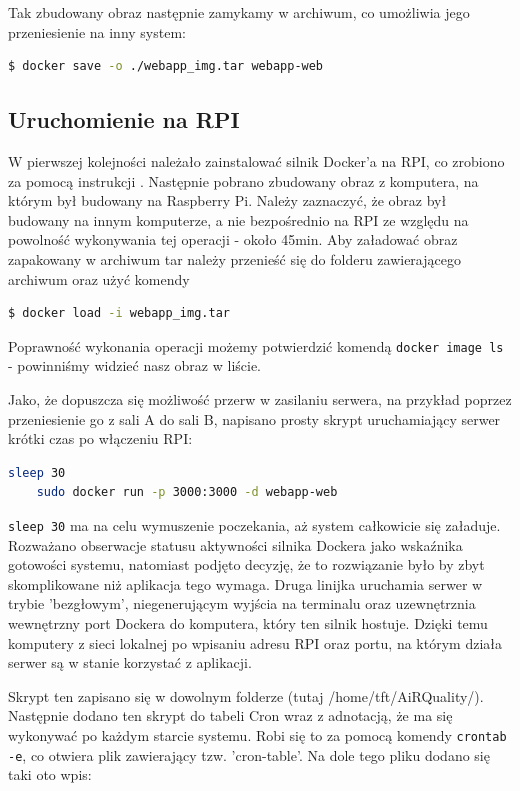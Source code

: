 Tak zbudowany obraz następnie zamykamy w archiwum, co umożliwia jego przeniesienie na inny system:

\begin{lstlisting}[language=bash]
    $ docker save -o ./webapp_img.tar webapp-web
\end{lstlisting}

\subsection{Uruchomienie na RPI}
W pierwszej kolejności należało zainstalować silnik Docker'a na RPI, co zrobiono za pomocą instrukcji \cite{dockerRPI}. Następnie pobrano zbudowany obraz z komputera,
na którym był budowany na Raspberry Pi. Należy zaznaczyć, że obraz był budowany na innym komputerze, a nie bezpośrednio na RPI ze względu na powolność wykonywania
tej operacji - około 45min.
Aby załadować obraz zapakowany w archiwum tar należy przenieść się do folderu zawierającego archiwum oraz użyć komendy

\begin{lstlisting}[language=bash]
    $ docker load -i webapp_img.tar
\end{lstlisting}

Poprawność wykonania operacji możemy potwierdzić komendą \lstinline|docker image ls| - powinniśmy widzieć nasz obraz w liście.

Jako, że dopuszcza się możliwość przerw w zasilaniu serwera, na przykład poprzez przeniesienie go z sali A do sali B, napisano prosty
skrypt uruchamiający serwer krótki czas po włączeniu RPI:

\begin{lstlisting}[language=bash]
    sleep 30
    sudo docker run -p 3000:3000 -d webapp-web
\end{lstlisting}

\lstinline|sleep 30| ma na celu wymuszenie poczekania, aż system całkowicie się załaduje. Rozważano obserwacje statusu aktywności silnika Dockera 
jako wskaźnika gotowości systemu, natomiast podjęto decyzję, że to rozwiązanie było by zbyt skomplikowane niż aplikacja tego wymaga.
Druga linijka uruchamia serwer w trybie 'bezgłowym', niegenerującym wyjścia na terminalu oraz uzewnętrznia wewnętrzny port Dockera
do komputera, który ten silnik hostuje. Dzięki temu komputery z sieci lokalnej po wpisaniu adresu RPI oraz portu, na którym działa serwer są 
w stanie korzystać z aplikacji.
 
Skrypt ten zapisano się w dowolnym folderze (tutaj /home/tft/AiRQuality/). Następnie dodano ten skrypt do tabeli Cron wraz z adnotacją, że
ma się wykonywać po każdym starcie systemu. Robi się to za pomocą komendy \lstinline|crontab -e|, co otwiera plik zawierający tzw. 'cron-table'.
Na dole tego pliku dodano się taki oto wpis:

